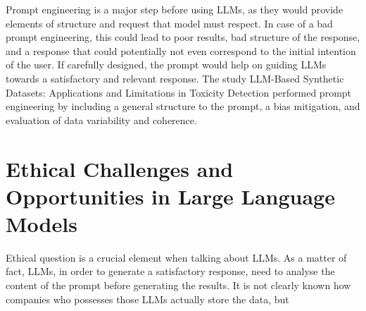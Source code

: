 Prompt engineering is a major step before using LLMs, as they would provide elements of structure and request that model must respect. In case of a bad prompt engineering, this could lead to poor results, bad structure of the response, and a response that could potentially not even correspond to the initial intention of the user. 
If carefully designed, the prompt would help on guiding LLMs towards a satisfactory and relevant response. The study LLM-Based Synthetic Datasets: Applications and Limitations in Toxicity Detection performed prompt engineering by including a general structure to the prompt, a bias mitigation, and evaluation of data variability and coherence. 





\section{Ethical Challenges and Opportunities in Large Language Models}



Ethical question is a crucial element when talking about LLMs. As a matter of fact, LLMs, in order to generate a satisfactory response, need to analyse the content of the prompt before generating the results. It is not clearly known how companies who possesses those LLMs actually store the data, but 




